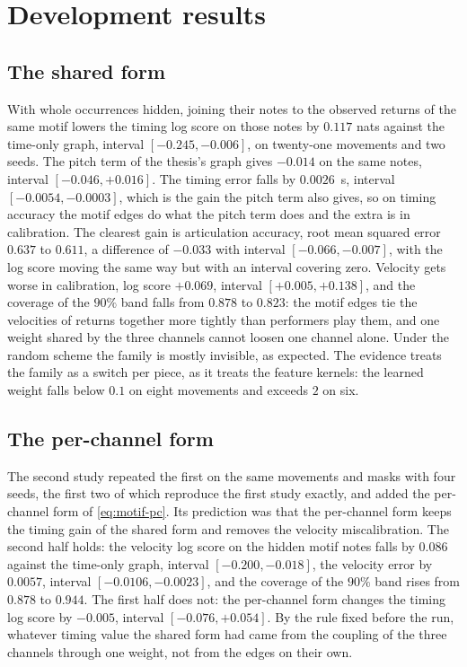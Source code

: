 \section{Development results}\label{sec:motif-dev}

\subsection{The shared form}\label{sec:motif-pilot1}
With whole occurrences hidden, joining their notes to the observed returns
of the same motif lowers the timing log score on those notes by $0.117$
nats against the time-only graph, interval $[-0.245, -0.006]$, on
twenty-one movements and two seeds. The pitch term of the thesis's graph
gives $-0.014$ on the same notes, interval $[-0.046, +0.016]$. The timing
error falls by $0.0026$~s, interval $[-0.0054, -0.0003]$, which is the gain
the pitch term also gives, so on timing accuracy the motif edges do what
the pitch term does and the extra is in calibration. The clearest gain is
articulation accuracy, root mean squared error $0.637$ to $0.611$, a
difference of $-0.033$ with interval $[-0.066, -0.007]$, with the log score
moving the same way but with an interval covering zero. Velocity gets
worse in calibration, log score $+0.069$, interval $[+0.005, +0.138]$, and
the coverage of the $90\%$ band falls from $0.878$ to $0.823$: the motif
edges tie the velocities of returns together more tightly than performers
play them, and one weight shared by the three channels cannot loosen one
channel alone. Under the random scheme the family is mostly invisible, as
expected. The evidence treats the family as a switch per piece, as it
treats the feature kernels: the learned weight falls below $0.1$ on eight
movements and exceeds $2$ on six.

\subsection{The per-channel form}\label{sec:motif-pilot2}
The second study repeated the first on the same movements and masks with
four seeds, the first two of which reproduce the first study exactly, and
added the per-channel form of \eqref{eq:motif-pc}. Its prediction was that
the per-channel form keeps the timing gain of the shared form and removes
the velocity miscalibration. The second half holds: the velocity log score
on the hidden motif notes falls by $0.086$ against the time-only graph,
interval $[-0.200, -0.018]$, the velocity error by $0.0057$, interval
$[-0.0106, -0.0023]$, and the coverage of the $90\%$ band rises from
$0.878$ to $0.944$. The first half does not: the per-channel form changes
the timing log score by $-0.005$, interval $[-0.076, +0.054]$. By the rule
fixed before the run, whatever timing value the shared form had came from
the coupling of the three channels through one weight, not from the edges
on their own.

